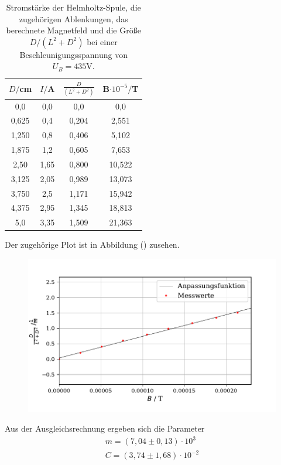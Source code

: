 \begin{table}[H]
  \centering
  \caption{Stromstärke der Helmholtz-Spule, die zugehörigen Ablenkungen, das berechnete Magnetfeld und die Größe $D/(L^2+D^2)$ bei einer Beschleunigungsspannung von $U_B = 435 \si{\volt}$.}
  \label{tab:Parameter}
  \begin{tabular}{c c c c}
    \toprule
    $D/$cm& $I/$A & $\frac{D}{(L^2+D^2)}$ & $ $B$ \cdot 10^{-5} /$T\\
    \bottomrule
    0,0 & 0,0 & 0,0 & 0,0\\
    0,625 & 0,4 & 0,204 & 2,551 \\
    1,250 & 0,8 & 0,406 & 5,102\\
    1,875 & 1,2 & 0,605 & 7,653\\
    2,50 & 1,65 & 0,800 & 10,522\\
    3,125 & 2,05 & 0,989 & 13,073\\
    3,750 & 2,5 & 1,171 & 15,942\\
    4,375 & 2,95 & 1,345 & 18,813\\
    5,0 & 3,35 & 1,509 & 21,363\\
    
     \bottomrule
  \end{tabular}
\end{table}

Der zugehörige Plot ist in Abbildung () zusehen.


\begin{figure}[H]
  \centering
  \includegraphics{plot2.pdf}
  \caption{}
  \label{fig:plot}
\end{figure}

Aus der Ausgleichsrechnung ergeben sich die Parameter
\begin{align*}
    m = (7,04 \pm 0,13) \cdot 10^{3} \\
    C = (3,74 \pm 1,68) \cdot 10^{-2}
\end{align*}


